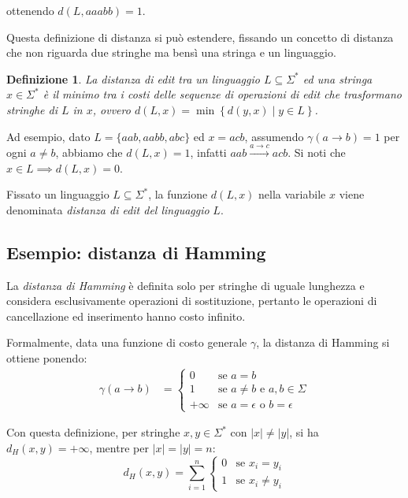 \documentclass[a4paper,12pt]{report}
\newtheorem{definition}{Definizione}[chapter]
\theoremstyle{propositionstyle}
\begin{document}
    ottenendo $d(L, aaabb) = 1$.

    Questa definizione di distanza si può estendere, fissando un concetto di distanza che non riguarda due stringhe ma bensì una stringa e un linguaggio.

    \begin{definition}
        La distanza di edit tra un linguaggio $L \subseteq \Sigma^*$ ed una stringa $x \in \Sigma^*$ è il minimo tra i costi delle sequenze di operazioni di edit
        che trasformano stringhe di $L$ in $x$, ovvero $d\left(L, x\right) = \min\left\{d\left(y, x\right) \mid y \in L \right\}$.
    \end{definition}

    Ad esempio, dato $L = \{aab, aabb, abc\}$ ed $x = acb$, assumendo $\gamma(a \rightarrow b) = 1$ per ogni $a \neq b$, abbiamo che $d\left(L, x\right) = 1$, infatti $aab \xrightarrow{a \rightarrow c} acb$. Si noti che $x \in L \implies d\left(L, x\right) = 0$.

    Fissato un linguaggio $L \subseteq \Sigma^*$, la funzione $d\left(L, x\right)$ nella variabile $x$ viene denominata \textit{distanza di edit del linguaggio} $L$.

    \subsection{Esempio: distanza di Hamming}

    La \textit{distanza di Hamming} è definita solo per stringhe di uguale lunghezza e considera esclusivamente operazioni di sostituzione, pertanto le operazioni di cancellazione ed inserimento hanno costo infinito.

    Formalmente, data una funzione di costo generale $\gamma$, la distanza di Hamming si ottiene ponendo:
    \begin{align}
        \gamma(a \rightarrow b) &= \begin{cases}
                                       0 & \text{se } a = b \\
                                       1 & \text{se } a \neq b \text{ e } a, b \in \Sigma \\
                                       +\infty & \text{se } a = \epsilon \text{ o } b = \epsilon
        \end{cases}
    \end{align}

    Con questa definizione, per stringhe $x, y \in \Sigma^*$ con $|x| \neq |y|$, si ha $d_H(x, y) = +\infty$, mentre per $|x| = |y| = n$:
    \[
        d_H(x, y) = \sum_{i=1}^{n} \begin{cases}
                                       0 & \text{se } x_i = y_i \\
                                       1 & \text{se } x_i \neq y_i
        \end{cases}
    \]
\end{document}
